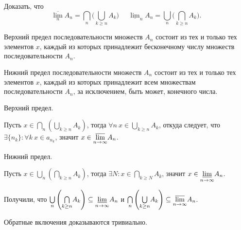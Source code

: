 \begin{task}{1}
Доказать, что
\begin{equation*}
    \overline{\lim_n}A_n =\displaystyle{\bigcap_n} \Big(\bigcup_{k \ge n} A_k\Big) \;\;\;\;\; \underline{\lim}_n A_n =\displaystyle{\bigcup_n} \Big(\bigcap_{k \ge n} A_k\Big).
\end{equation*}
\end{task}
\begin{solution}

Верхний предел последовательности множеств $A_n$ состоит из тех и только тех элементов $x$, каждый из которых принадлежит бесконечному числу множеств последовательности $A_n$.

Нижний предел последовательности множеств $A_n$ состоит из тех и только тех элементов $x$, каждый из которых принадлежит всем множествам последовательности $A_n$, за исключением, быть может, конечного числа. 

Верхний предел.

Пусть $x \in \underset{n}{\bigcap} \left( \underset{k \geq n}{\bigcup} A_k \right)$, тогда $\forall n ~ x \in \underset{k \geq n}{\bigcup} A_k$, откуда следует, что $\exists \lbrace n_k \rbrace : \forall k ~ x \in a_{n_k}$, значит $x \in \underset{n \to \infty}{\varlimsup} A_n$.

Нижний предел.

Пусть $x \in \underset{n}{\bigcup} \left( \underset{k \geq n}{\bigcap} A_k \right)$, тогда $\exists N : x \in \underset{k \geq N}{\bigcap} A_k$, значит $x \in \underset{n \to \infty}{\varliminf} A_n$.

Получили, что $\underset{n}{\bigcup} \left( \underset{k \geq n}{\bigcap} A_k \right) \subseteq \underset{n \to \infty}{\varliminf} A_n$ и $\underset{n}{\bigcap} \left( \underset{k \geq n}{\bigcup} A_k \right) \subseteq \underset{n \to \infty}{\varlimsup} A_n$.

Обратные включения доказываются тривиально. 
\end{solution}